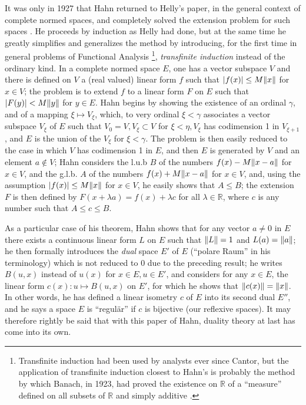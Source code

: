 \documentclass[12pt,a4paper,leqno,twoside]{extbook}
\DeclarePairedDelimiter{\norm}{\lVert}{\rVert}
\newcommand{\R}{\mathbb{R}}
\begin{document}
It was only in 1927 that Hahn returned to Helly's paper, in the general context of complete normed spaces, and completely solved the extension problem for such spaces \cite{098}. He proceeds by induction as Helly had done, but at the same time he greatly simplifies and generalizes the method by introducing, for the first time in general problems of Functional Analysis \footnote{Transfinite induction had been used by analysts ever since Cantor, but the application of transfinite induction closest to Hahn's is probably the method by which Banach, in 1923, had proved the existence on \(\R\) of a ``measure'' defined on all subsets of \(\R\) and simply additive \cite{013}.}, \emph{transfinite induction} instead of the ordinary kind. In a complete normed space \(E\), one has a vector subspace \(V\) and there is defined on \(V\) a (real valued) linear form \(f\) such that \(|f(x)| \leq M\norm{x}\) for \(x \in V\); the problem is to extend \(f\) to a linear form \(F\) on \(E\) such that \(|F(y)| < M\norm{y}\) for \(y \in E\). Hahn begins by showing the existence of an ordinal \(\gamma\), and of a mapping \(\xi \mapsto V_\xi\), which, to very ordinal \(\xi < \gamma\) associates a vector subspace \(V_\xi\) of \(E\) such that \(V_0 = V, V_\xi \subset V\) for \(\xi < \eta, V_\xi\) has codimension 1 in \(V_{\xi + 1}\), and \(E\) is the union of the \(V_\xi\) for \(\xi < \gamma\). The problem is then easily reduced to the case in which \(V\) has codimension 1 in \(E\), and then \(E\) is generated by \(V\) and an element \(a \not\in V\); Hahn considers the l.u.b \(B\) of the numbers \(f(x) - M\norm{x-a}\) for \(x \in V\), and the g.l.b. \(A\) of the numbers \(f(x) + M\norm{x-a}\) for \(x \in V\), and, using the assumption \(|f(x)| \leq M\norm{x}\) for \(x \in V\), he easily shows that \(A \leq B\); the extension \(F\) is then defined by \(F(x+\lambda a) = f(x) + \lambda c\) for all \(\lambda \in \R\), where \(c\) is any number such that \(A \leq c \leq B\).

As a particular case of his theorem, Hahn shows that for any vector \(a \neq 0\) in \(E\) there exists a continuous linear form \(L\) on \(E\) such that \(\norm{L} = 1\) and \(L(a) = \norm{a}\); he then formally introduces the \emph{dual} space \(E'\) of \(E\) (``polare Raum'' in his terminology) which is not reduced to 0 due to the preceding result; he writes \(B(u,x)\) instead of \(u(x)\) for \(x \in E, u \in E'\), and considers for any \(x \in E\), the linear form \(c(x): u \mapsto B(u,x)\) on \(E'\), for which he shows that \(\norm{c(x)} = \norm{x}\). In other words, he has defined a linear isometry \(c\) of \(E\) into its second dual \(E''\), and he says a space \(E\) is ``regulär'' if \(c\) is bijective (our reflexive spaces). It may therefore rightly be said that with this paper of Hahn, duality theory at last has come into its own.
\end{document}
